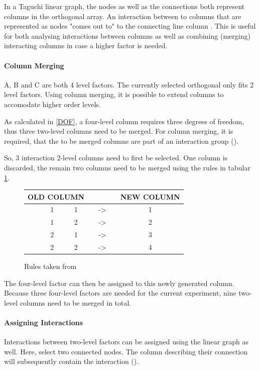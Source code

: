 In a Taguchi linear graph, the nodes as well as the connections both represent columns in the orthogonal array. An interaction between to columns that are represented as nodes "comes out to" to the connecting line column \cite{taguchi_taguchis_2005}. This is useful for both analysing interactions between columns as well as combining (merging) interacting columns in case a higher factor is needed.

\paragraph{Column Merging}
A, B and C are both 4 level factors. The currently selected orthogonal only fits 2 level factors. Using column merging, it is possible to extend columns to accomodate higher order levels. 

As calculated in \ref{DOF}, a four-level column requires three degrees of freedom, thus three two-level columns need to be merged. For column merging, it is required, that the to be merged columns are part of an interaction group (\cite{yang_design_2009}).

So, 3 interaction 2-level columns need to first be selected. One column is discarded, the remain two columns need to be merged using the rules in tabular \ref{table:hyperparameter_tuning:merging_rules}.

\begin{figure}[ht]
	\centering
	\begin{tabular}{ |ccccccc|  }
		\hline
		\multicolumn{3}{|c}{ OLD COLUMN } & & & & NEW COLUMN \\
		\hline
		& 1 & 1 & & -> & & 1\\
		& 1 & 2 & & -> & & 2\\
		& 2 & 1 & & -> & & 3\\
		& 2 & 2 & & -> & & 4\\
		\hline
	\end{tabular}
	\caption{Rules taken from \cite{roy_primer_1990}}
	\label{table:hyperparameter_tuning:merging_rules}
\end{figure}

The four-level factor can then be assigned to this newly generated column. Because three four-level factors are needed for the current experiment, nine two-level columns need to be merged in total.

\paragraph{Assigning Interactions}
Interactions between two-level factors can be assigned using the linear graph as well. Here, select two connected nodes. The column describing their connection will subsequently contain the interaction (\cite{taguchi_taguchis_2005}).

